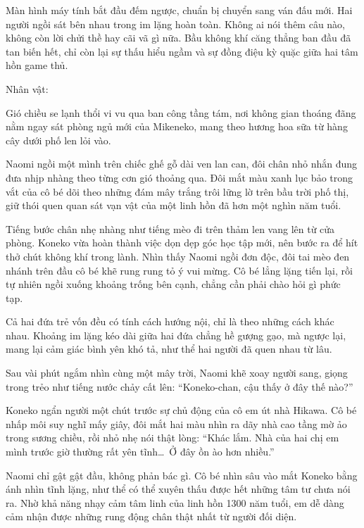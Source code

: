 ﻿\documentclass[../main.tex]{subfiles}
\begin{document}
Màn hình máy tính bắt đầu đếm ngược, chuẩn bị chuyển sang ván đấu mới. Hai người ngồi sát bên nhau trong im lặng hoàn toàn. Không ai nói thêm câu nào, không còn lời chửi thề hay cãi vã gì nữa. Bầu không khí căng thẳng ban đầu đã tan biến hết, chỉ còn lại sự thấu hiểu ngầm và sự đồng điệu kỳ quặc giữa hai tâm hồn game thủ.

\newpage

\begin{center}
    {\caviar\fontsize{12pt}{12pt}\selectfont Nhân vật:   }
\end{center}

Gió chiều se lạnh thổi vi vu qua ban công tầng tám, nơi không gian thoáng đãng nằm ngay sát phòng ngủ mới của Mikeneko, mang theo hương hoa sữa từ hàng cây dưới phố len lỏi vào.

Naomi ngồi một mình trên chiếc ghế gỗ dài ven lan can, đôi chân nhỏ nhắn đung đưa nhịp nhàng theo từng cơn gió thoảng qua. Đôi mắt màu xanh lục bảo trong vắt của cô bé dõi theo những đám mây trắng trôi lững lờ trên bầu trời phố thị, giữ thói quen quan sát vạn vật của một linh hồn đã hơn một nghìn năm tuổi.

Tiếng bước chân nhẹ nhàng như tiếng mèo đi trên thảm len vang lên từ cửa phòng. Koneko vừa hoàn thành việc dọn dẹp góc học tập mới, nên bước ra để hít thở chút không khí trong lành. Nhìn thấy Naomi ngồi đơn độc, đôi tai mèo đen nhánh trên đầu cô bé khẽ rung rung tỏ ý vui mừng. Cô bé lẳng lặng tiến lại, rồi tự nhiên ngồi xuống khoảng trống bên cạnh, chẳng cần phải chào hỏi gì phức tạp.

Cả hai đứa trẻ vốn đều có tính cách hướng nội, chỉ là theo những cách khác nhau. Khoảng im lặng kéo dài giữa hai đứa chẳng hề gượng gạo, mà ngược lại, mang lại cảm giác bình yên khó tả, như thể hai người đã quen nhau từ lâu.

Sau vài phút ngắm nhìn cùng một mây trời, Naomi khẽ xoay người sang, giọng trong trẻo như tiếng nước chảy cất lên: ``Koneko-chan, cậu thấy ở đây thế nào?''

Koneko ngẩn người một chút trước sự chủ động của cô em út nhà Hikawa. Cô bé nhấp môi suy nghĩ mấy giây, đôi mắt hai màu nhìn ra dãy nhà cao tầng mờ ảo trong sương chiều, rồi nhỏ nhẹ nói thật lòng: ``Khác lắm. Nhà của hai chị em mình trước giờ thường rất yên tĩnh\dots\ Ở đây ồn ào hơn nhiều.''

Naomi chỉ gật gật đầu, không phản bác gì. Cô bé nhìn sâu vào mắt Koneko bằng ánh nhìn tĩnh lặng, như thể có thể xuyên thấu được hết những tâm tư chưa nói ra. Nhờ khả năng nhạy cảm tâm linh của linh hồn 1300 năm tuổi, em dễ dàng cảm nhận được những rung động chân thật nhất từ người đối diện.
\end{document}
